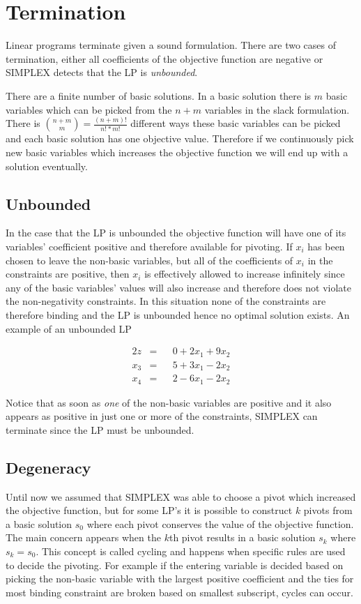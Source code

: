 \section{Termination}
Linear programs terminate given a sound formulation. There are two cases of termination, either all coefficients of the objective function are negative or SIMPLEX detects that the LP is \textit{unbounded}. 

There are a finite number of basic solutions. In a basic solution there is $m$ basic variables which can be picked from the $n + m$ variables in the slack formulation. There is ${{n+m}\choose{m}} = \frac{(n+m)!}{n!*m!}$ different ways these basic variables can be picked and each basic solution has one objective value. Therefore if we continuously pick new basic variables which increases the objective function we will end up with a solution eventually.

\subsection{Unbounded}
In the case that the LP is unbounded the objective function will have one of its variables' coefficient positive and therefore available for pivoting. If $x_i$ has been chosen to leave the non-basic variables, but all of the coefficients of $x_i$ in the constraints are positive, then $x_i$ is effectively allowed to increase infinitely since any of the basic variables' values will also increase and therefore does not violate the non-negativity constraints. In this situation none of the constraints are therefore binding and the LP is unbounded hence no optimal solution exists. An example of an unbounded LP

\begin{alignat}{2}
z        &= && 0 + 2 x_1 + 9x_2\\
x_3      &= && 5 + 3 x_1 - 2x_2\\
x_4      &= && 2 - 6 x_1 - 2x_2
\end{alignat}

Notice that as soon as \textit{one} of the non-basic variables are positive and it also appears as positive in just one or more of the constraints, SIMPLEX can terminate since the LP must be unbounded.

\subsection{Degeneracy}
Until now we assumed that SIMPLEX was able to choose a pivot which increased the objective function, but for some LP's it is possible to construct $k$ pivots from a basic solution $s_0$ where each pivot conserves the value of the objective function. The main concern appears when the $k$th pivot results in a basic solution $s_k$ where $s_k = s_0$. This concept is called cycling and happens when specific rules are used to decide the pivoting. For example if the entering variable is decided based on picking the non-basic variable with the largest positive coefficient and the ties for most binding constraint are broken based on smallest subscript, cycles can occur. 


